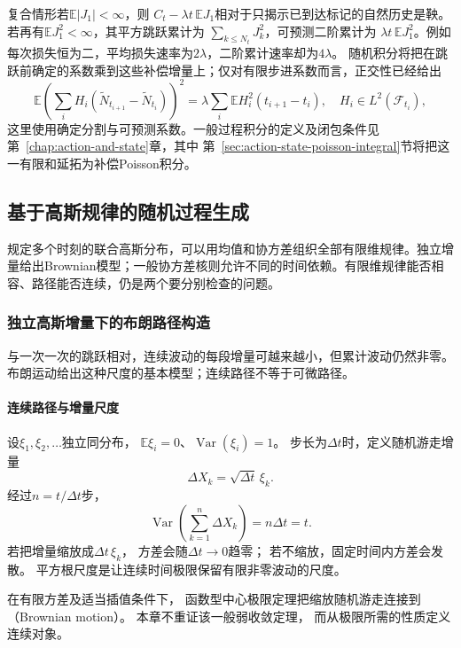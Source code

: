 复合情形若\(\mathbb E|J_1|<\infty\)，则
\(C_t-\lambda t\,\mathbb EJ_1\)相对于只揭示已到达标记的自然历史是鞅。
若再有\(\mathbb EJ_1^2<\infty\)，其平方跳跃累计为
\(\sum_{k\leq N_t}J_k^2\)，可预测二阶累计为
\(\lambda t\,\mathbb EJ_1^2\)。例如每次损失恒为二，平均损失速率为\(2\lambda\)，二阶累计速率却为\(4\lambda\)。
随机积分将把在跳跃前确定的系数乘到这些补偿增量上；仅对有限步进系数而言，正交性已经给出
\[
\mathbb E\left(\sum_iH_i
(\widetilde N_{t_{i+1}}-\widetilde N_{t_i})\right)^2
=\lambda\sum_i\mathbb E H_i^2(t_{i+1}-t_i),
\quad H_i\in L^2(\mathcal F_{t_i}),
\]
这里使用确定分割与可预测系数。一般过程积分的定义及闭包条件见
第~\ref{chap:action-and-state}章，其中
第~\ref{sec:action-state-poisson-integral}节将把这一有限和延拓为补偿Poisson积分。

\subsection{基于高斯规律的随机过程生成}

规定多个时刻的联合高斯分布，可以用均值和协方差组织全部有限维规律。独立增量给出Brownian模型；一般协方差核则允许不同的时间依赖。有限维规律能否相容、路径能否连续，仍是两个要分别检查的问题。
\label{sec:rv-gaussian-generation}


\subsubsection{独立高斯增量下的布朗路径构造}
\label{sec:dynamical-brownian-motion}
与一次一次的跳跃相对，连续波动的每段增量可越来越小，但累计波动仍然非零。布朗运动给出这种尺度的基本模型；连续路径不等于可微路径。

\paragraph{连续路径与增量尺度}

设$\xi_{1},\xi_{2},\ldots$独立同分布， $\mathbb{E}\xi_{i}=0$、$\operatorname{Var}
(\xi_{i})=1$。 步长为$\Delta t$时，定义随机游走增量
\[
	\Delta X_{k}=\sqrt{\Delta t}\,\xi_{k}.
\]
经过$n=t/\Delta t$步，
\[
	\operatorname{Var}\left( \sum_{k=1}^{n}\Delta X_{k}\right) = n\Delta t=t.
\]
若把增量缩放成$\Delta t\,\xi_{k}$， 方差会随$\Delta t\to0$趋零；
若不缩放，固定时间内方差会发散。
平方根尺度是让连续时间极限保留有限非零波动的尺度。

在有限方差及适当插值条件下， 函数型中心极限定理把缩放随机游走连接到（Brownian motion）。 本章不重证该一般弱收敛定理，
而从极限所需的性质定义连续对象。

